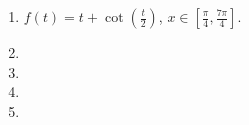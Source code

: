 \begin{multicols}{2}
\begin{enumerate}[ref={\fcProblemRef}]

\item $\displaystyle f(t)=t+\cot \left(\frac{t}{2}\right) $, $x\in [\frac{\pi}{4},\frac{7\pi}{4} ]$.
\item 
\item 
\item 
\item 
\end{enumerate}
\end{multicols}
